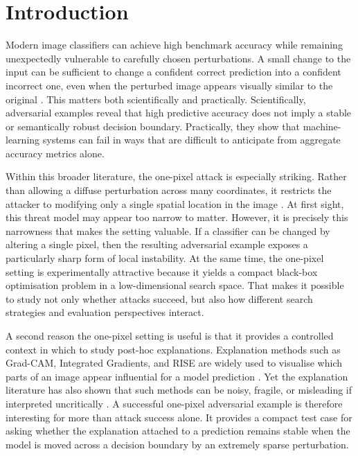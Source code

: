 \section{Introduction}
\label{sec:introduction}

Modern image classifiers can achieve high benchmark accuracy while remaining unexpectedly vulnerable to carefully chosen perturbations.
A small change to the input can be sufficient to change a confident correct prediction into a confident incorrect one, even when the perturbed image appears visually similar to the original \cite{szegedy2014intriguing,goodfellow2015explaining}.
This matters both scientifically and practically.
Scientifically, adversarial examples reveal that high predictive accuracy does not imply a stable or semantically robust decision boundary.
Practically, they show that machine-learning systems can fail in ways that are difficult to anticipate from aggregate accuracy metrics alone.

Within this broader literature, the one-pixel attack is especially striking.
Rather than allowing a diffuse perturbation across many coordinates, it restricts the attacker to modifying only a single spatial location in the image \cite{su2019onepixel}.
At first sight, this threat model may appear too narrow to matter.
However, it is precisely this narrowness that makes the setting valuable.
If a classifier can be changed by altering a single pixel, then the resulting adversarial example exposes a particularly sharp form of local instability.
At the same time, the one-pixel setting is experimentally attractive because it yields a compact black-box optimisation problem in a low-dimensional search space.
That makes it possible to study not only whether attacks succeed, but also how different search strategies and evaluation perspectives interact.

A second reason the one-pixel setting is useful is that it provides a controlled context in which to study post-hoc explanations.
Explanation methods such as Grad-CAM, Integrated Gradients, and RISE are widely used to visualise which parts of an image appear influential for a model prediction \cite{selvaraju2017gradcam,sundararajan2017ig,petsiuk2018rise}.
Yet the explanation literature has also shown that such methods can be noisy, fragile, or misleading if interpreted uncritically \cite{adebayo2018sanity,alvarezmelis2018robustness,ghorbani2019fragile}.
A successful one-pixel adversarial example is therefore interesting for more than attack success alone.
It provides a compact test case for asking whether the explanation attached to a prediction remains stable when the model is moved across a decision boundary by an extremely sparse perturbation.

